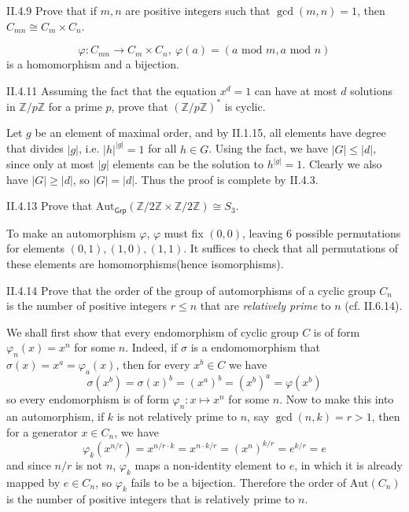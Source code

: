 \begin{problem}{II.4.9}
Prove that if $m, n$ are positive integers such that $\gcd(m,n) = 1$, then $C_{mn} \cong C_m \times C_n$.
\end{problem}
\begin{pf}
\[
\varphi:C_{mn} \to C_m \times C_n ,\: \varphi(a) = (a \text{ mod } m, a \text{ mod } n)
\]
is a homomorphism and a bijection.
\end{pf}

\begin{problem}{II.4.11}
Assuming the fact that the equation $x^d = 1$ can have at most $d$ solutions in $\mathbb{Z}/p\mathbb{Z}$ for a prime $p$, prove that $(\mathbb{Z}/p\mathbb{Z})^*$ is cyclic.
\end{problem}
\begin{pf}
Let $g$ be an element of maximal order, and by II.1.15, all elements have degree that divides $|g|$, i.e. $|h|^{|g|} = 1$ for all $h \in G$. Using the fact, we have $|G| \leq |d|$, since only at most $|g|$ elements can be the solution to $h^{|g|} = 1$. Clearly we also have $|G| \geq |d|$, so $|G| = |d|$. Thus the proof is complete by II.4.3.
\end{pf}

\begin{problem}{II.4.13}
Prove that $\text{Aut}_\textsf{Grp}(\mathbb{Z}/2\mathbb{Z} \times \mathbb{Z}/2\mathbb{Z}) \cong S_3$.
\end{problem}
\begin{pf}
To make an automorphism $\varphi$, $\varphi$ must fix $(0,0)$, leaving 6 possible permutations for elements $(0,1), (1,0), (1,1)$. It suffices to check that all permutations of these elements are homomorphisms(hence isomorphisms). 
\end{pf}

\begin{problem}{II.4.14}
Prove that the order of the group of automorphisms of a cyclic group $C_n$ is the number of positive integers $r \leq n$ that are \emph{relatively prime} to $n$ (cf. II.6.14).	
\end{problem}
\begin{pf}
We shall first show that every endomorphism of cyclic group $C$ is of form $\varphi_n(x) = x^n$ for some $n$. Indeed, if $\sigma$ is a endomomorphism that $\sigma(x) = x^a = \varphi_a(x)$, then for every $x^b \in C$ we have
\[
\sigma(x^b) = \sigma(x)^b = (x^a)^b = (x^b)^a = \varphi(x^b)	
\]
so every endomorphism is of form $\varphi_n : x \mapsto x^n$ for some $n$. Now to make this into an automorphism, if $k$ is not relatively prime to $n$, say $\gcd(n,k) = r > 1$, then for a generator $x \in C_n$, we have
\[
\varphi_k(x^{n/r}) = x^{n/r \cdot k} = x^{n \cdot k/r} = (x^{n})^{k/r} = e^{k/r} = e
\]
and since $n/r$ is not $n$, $\varphi_k$ maps a non-identity element to $e$, in which it is already mapped by $e \in C_n$, so $\varphi_k$ fails to be a bijection. Therefore the order of $\text{Aut}(C_n)$ is the number of positive integers that is relatively prime to $n$.
\end{pf}

